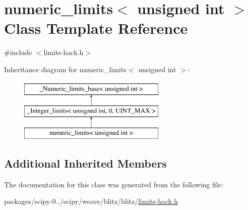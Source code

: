 \hypertarget{classnumeric__limits_3_01unsigned_01int_01_4}{}\section{numeric\+\_\+limits$<$ unsigned int $>$ Class Template Reference}
\label{classnumeric__limits_3_01unsigned_01int_01_4}


{\ttfamily \#include $<$limits-\/hack.\+h$>$}

Inheritance diagram for numeric\+\_\+limits$<$ unsigned int $>$\+:\begin{figure}[H]
\begin{center}
\leavevmode
\includegraphics[height=3.000000cm]{classnumeric__limits_3_01unsigned_01int_01_4}
\end{center}
\end{figure}
\subsection*{Additional Inherited Members}


The documentation for this class was generated from the following file\+:\begin{DoxyCompactItemize}
\item 
packages/scipy-\/0../scipy/weave/blitz/blitz/\hyperlink{limits-hack_8h}{limits-\/hack.\+h}\end{DoxyCompactItemize}
